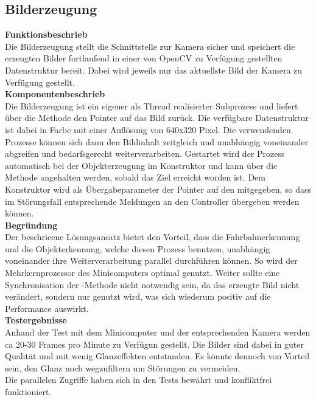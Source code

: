 \subsection{Bilderzeugung}

\textbf{Funktionsbeschrieb}\\[0.2cm]
Die Bilderzeugung stellt die Schnittstelle zur Kamera sicher und speichert die erzeugten Bilder fortlaufend in einer von OpenCV zu Verfügung gestellten Datenstruktur bereit. Dabei wird jeweils nur das aktuellste Bild der Kamera zu Verfügung gestellt.\\[0.2cm]
\textbf{Komponentenbeschrieb}\\[0.2cm]
Die Bilderzeugung ist ein eigener als Thread realisierter Subprozess und liefert über die Methode  den Pointer auf das Bild zurück. Die verfügbare Datenstruktur ist dabei  in Farbe mit einer Auflösung von 640x320 Pixel. Die verwendenden Prozesse können sich dann den Bildinhalt zeitgleich und unabhängig voneinander abgreifen und bedarfsgerecht weiterverarbeiten. Gestartet wird der Prozess automatisch bei der Objekterzeugung im Konstruktor und kann über die Methode  angehalten werden, sobald das Ziel erreicht worden ist. Dem Konstruktor wird als Übergabeparameter der Pointer auf den  mitgegeben, so dass im Störungsfall entsprechende Meldungen an den Controller übergeben werden können.\\[0.2cm]
\textbf{Begründung}\\[0.2cm]
Der beschrieene Lösungsansatz bietet den Vorteil, dass die Fahrbahnerkennung und die Objekterkennung, welche diesen Prozess benutzen, unabhängig voneinander ihre Weiterverarbeitung parallel durchführen können. So wird der Mehrkernprozessor des Minicomputers optimal genutzt. Weiter  sollte eine Synchronisation der -Methode nicht notwendig sein, da das erzeugte Bild nicht verändert, sondern nur genutzt wird, was sich wiederum positiv auf die Performance auswirkt.\\[0.2cm]
\textbf{Testergebnisse}\\[0.2cm]
Anhand der Test mit dem Minicomputer und der entsprechenden Kamera werden ca 20-30 Frames pro Minute zu Verfügun gestellt. Die Bilder sind dabei in guter Qualität und mit wenig Glanzeffekten entstanden. Es könnte dennoch von Vorteil sein, den Glanz noch wegzufiltern um Störungen zu vermeiden.\\
Die parallelen Zugriffe haben sich in den Tests bewährt und konfliktfrei funktioniert.